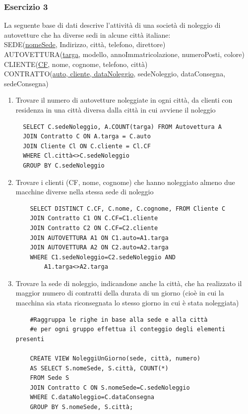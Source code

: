 \documentclass[a4paper]{article}
\begin{document}
\begin{enumerate}[leftmargin=*]
\subsubsection{Esercizio 3}
La seguente base di dati descrive l'attività di una società di noleggio di autovetture che ha diverse sedi in alcune città italiane:\medskip\\
SEDE(\underline{nomeSede}, Indirizzo, città, telefono, direttore)\\
AUTOVETTURA(\underline{targa}, modello, annoImmatricolazione, numeroPosti, colore)\\
CLIENTE(\underline{CF}, nome, cognome, telefono, città)\\
CONTRATTO(\underline{auto, cliente, dataNoleggio}, sedeNoleggio, dataConsegna, sedeConsegna)

\begin{enumerate}
  \item Trovare il numero di autovetture noleggiate in ogni città, da clienti con residenza in una città diversa dalla città in cui avviene il noleggio
  \begin{verbatim}
  SELECT C.sedeNoleggio, A.COUNT(targa) FROM Autovettura A
  JOIN Contratto C ON A.targa = C.auto
  JOIN Cliente Cl ON C.cliente = Cl.CF
  WHERE Cl.città<>C.sedeNoleggio
  GROUP BY C.sedeNoleggio
  \end{verbatim}
  \item Trovare i clienti (CF, nome, cognome) che hanno noleggiato almeno due macchine diverse nella stessa sede di noleggio
  \begin{verbatim}
    SELECT DISTINCT C.CF, C.nome, C.cognome, FROM Cliente C
    JOIN Contratto C1 ON C.CF=C1.cliente
    JOIN Contratto C2 ON C.CF=C2.cliente
    JOIN AUTOVETTURA A1 ON C1.auto=A1.targa
    JOIN AUTOVETTURA A2 ON C2.auto=A2.targa
    WHERE C1.sedeNoleggio=C2.sedeNoleggio AND
        A1.targa<>A2.targa
  \end{verbatim}
  \item Trovare la sede di noleggio, indicandone anche la città, che ha realizzato il maggior numero di contratti della durata di un giorno (cioè in cui la macchina sia stata riconsegnata lo stesso giorno in cui è stata noleggiata)
  \begin{verbatim}
    #Raggruppa le righe in base alla sede e alla città
    #e per ogni gruppo effettua il conteggio degli elementi presenti

    CREATE VIEW NoleggiUnGiorno(sede, città, numero)
    AS SELECT S.nomeSede, S.città, COUNT(*)
    FROM Sede S
    JOIN Contratto C ON S.nomeSede=C.sedeNoleggio
    WHERE C.dataNoleggio=C.dataConsegna
    GROUP BY S.nomeSede, S.città;


\end{verbatim}
\end{enumerate}
\end{enumerate}
\end{document}
